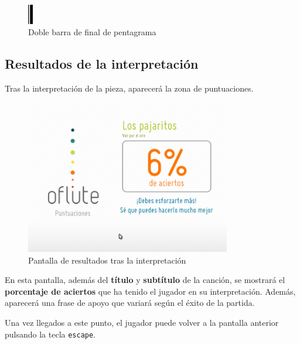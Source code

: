 \begin{figure}[h!]
  \centering
  \includegraphics[width=0.02\textwidth]{apendice_manual_usuario/imagen_figFinal}
  \caption{Doble barra de final de pentagrama}
\end{figure}

\subsection{Resultados de la interpretación}
Tras la interpretación de la pieza, aparecerá la zona de puntuaciones.

\begin{figure}[h!]
  \centering
  \includegraphics[width=0.8\textwidth]{apendice_manual_usuario/imagen_seccionCanciones3}
  \caption{Pantalla de resultados tras la interpretación}
\end{figure}

En esta pantalla, además del \textbf{título} y \textbf{subtítulo} de la canción,
se mostrará el \textbf{porcentaje de aciertos} que ha tenido el jugador en su
interpretación. Además, aparecerá una frase de apoyo que variará según el éxito
de la partida.

Una vez llegados a este punto, el jugador puede volver a la pantalla anterior
pulsando la tecla \texttt{escape}.
